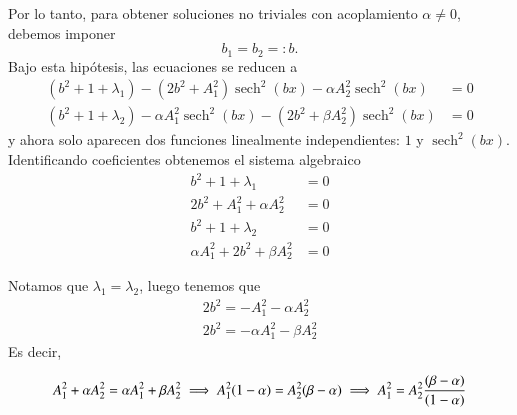 \documentclass[letterpaper,11pt]{exam}
\newcommand{\sech}{\operatorname{sech}}
\theoremstyle{plain}
\begin{document}
Por lo tanto, para obtener soluciones no triviales con acoplamiento $\alpha \neq 0$, 
debemos imponer
\begin{equation*}
    b_1 = b_2 =: b.
\end{equation*}
Bajo esta hipótesis, las ecuaciones se reducen a
\begin{align*}
    (b^2 + 1+\lambda_1) - (2b^2 + A_1^2)\sech^2(bx) - \alpha A_2^2\sech^2(bx) &= 0 \\
    (b^2 + 1+\lambda_2) - \alpha A_1^2\sech^2(bx) - (2b^2 + \beta A_2^2)\sech^2(bx) &= 0
\end{align*}
y ahora solo aparecen dos funciones linealmente independientes: $1$ y 
$\sech^2(bx)$. Identificando coeficientes obtenemos el sistema algebraico
\begin{align*}
    b^2 + 1 + \lambda_1 &= 0 \\
    2b^2 + A_1^2 + \alpha A_2^2 &= 0 \\
    b^2 + 1 + \lambda_2 &= 0 \\
    \alpha A_1^2 + 2b^2 + \beta A_2^2 &= 0
\end{align*}

Notamos que $\lambda_1=\lambda_2$, luego tenemos que 
\begin{align*}
    2b^2 =- A_1^2 - \alpha A_2^2  \\
    2b^2 =- \alpha A_1^2  -\beta A_2^2 
\end{align*}
Es decir, 

\begin{equation}
    A_1^2+\alpha A_2^2=\alpha A_1^2+\beta A_2^2 \\
    \implies A_1^2(1-\alpha)=A_2^2(\beta-\alpha) \\
    \implies A_1^2=A_2^2\frac{(\beta-\alpha)}{(1-\alpha)}
\end{equation}
\end{document}
